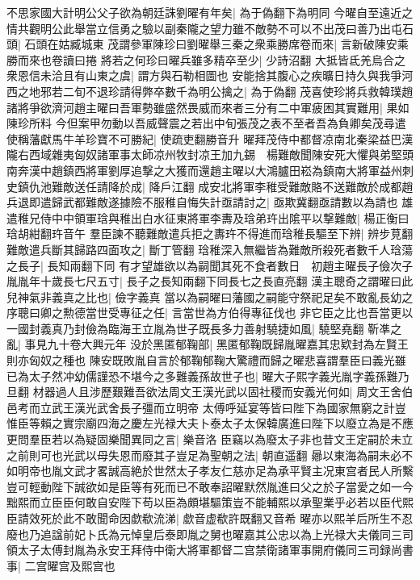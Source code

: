 不思家國大計明公父子欲為朝廷誅劉曜有年矣|{
	為于偽翻下為明同}
今曜自至遠近之情共觀明公此舉當立信勇之驗以副秦隴之望力雖不敵勢不可以不出茂曰善乃出屯石頭|{
	石頭在姑臧城東}
茂謂參軍陳珍曰劉曜舉三秦之衆乘勝席卷而來|{
	言新破陳安乘勝而來也卷讀曰捲}
將若之何珍曰曜兵雖多精卒至少|{
	少詩沼翻}
大抵皆氐羌烏合之衆恩信未洽且有山東之虞|{
	謂方與石勒相圖也}
安能捨其腹心之疾曠日持久與我爭河西之地邪若二旬不退珍請得弊卒數千為明公擒之|{
	為于偽翻}
茂喜使珍將兵救韓璞趙諸將爭欲濟河趙主曜曰吾軍勢雖盛然畏威而來者三分有二中軍疲困其實難用|{
	果如陳珍所料}
今但案甲勿動以吾威聲震之若出中旬張茂之表不至者吾為負卿矣茂尋遣使稱藩獻馬牛羊珍寶不可勝紀|{
	使疏吏翻勝音升}
曜拜茂侍中都督凉南北秦梁益巴漢隴右西域雜夷匈奴諸軍事太師凉州牧封凉王加九錫　楊難敵聞陳安死大懼與弟堅頭南奔漢中趙鎮西將軍劉厚追撃之大獲而還趙主曜以大鴻臚田崧為鎮南大將軍益州刺史鎮仇池難敵送任請降於成|{
	降戶江翻}
成安北將軍李稚受難敵賂不送難敵於成都趙兵退即遣歸武都難敵遂據險不服稚自悔失計亟請討之|{
	亟欺冀翻亟請數以為請也}
雄遣稚兄侍中中領軍琀與稚出白水征東將軍李夀及琀弟玝出隂平以撃難敵|{
	楊正衡曰琀胡紺翻玝音午}
羣臣諫不聽難敵遣兵拒之夀玝不得進而琀稚長驅至下辨|{
	辨步莧翻}
難敵遣兵斷其歸路四面攻之|{
	斷丁管翻}
琀稚深入無繼皆為難敵所殺死者數千人琀蕩之長子|{
	長知兩翻下同}
有才望雄欲以為嗣聞其死不食者數日　初趙主曜長子儉次子胤胤年十歲長七尺五寸|{
	長子之長知兩翻下同長七之長直亮翻}
漢主聰奇之謂曜曰此兒神氣非義真之比也|{
	儉字義真}
當以為嗣曜曰藩國之嗣能守祭祀足矣不敢亂長幼之序聰曰卿之勲德當世受專征之任|{
	言當世為方伯得專征伐也}
非它臣之比也吾當更以一國封義真乃封儉為臨海王立胤為世子既長多力善射驍捷如風|{
	驍堅堯翻}
靳凖之亂|{
	事見九十卷大興元年}
没於黑匿郁鞠部|{
	黑匿郁鞠既歸胤曜嘉其忠欵封為左賢王則亦匈奴之種也}
陳安既敗胤自言於郁鞠郁鞠大驚禮而歸之曜悲喜謂羣臣曰義光雖已為太子然冲幼儒謹恐不堪今之多難義孫故世子也|{
	曜大子熙字義光胤字義孫難乃旦翻}
材器過人且涉歷艱難吾欲法周文王漢光武以固社稷而安義光何如|{
	周文王舍伯邑考而立武王漢光武舍長子彊而立明帝}
太傅呼延宴等皆曰陛下為國家無窮之計豈惟臣等賴之實宗廟四海之慶左光禄大夫卜泰太子太保韓廣進曰陛下以廢立為是不應更問羣臣若以為疑固樂聞異同之言|{
	樂音洛}
臣竊以為廢太子非也昔文王定嗣於未立之前則可也光武以母失恩而廢其子豈足為聖朝之法|{
	朝直遥翻}
曏以東海為嗣未必不如明帝也胤文武才畧誠高絶於世然太子孝友仁慈亦足為承平賢主况東宫者民人所繫豈可輕動陛下誠欲如是臣等有死而已不敢奉詔曜默然胤進曰父之於子當愛之如一今黜熙而立臣臣何敢自安陛下苟以臣為頗堪驅策豈不能輔熙以承聖業乎必若以臣代熙臣請效死於此不敢聞命因歔欷流涕|{
	歔音虚欷許既翻又音希}
曜亦以熙羊后所生不忍廢也乃追諡前妃卜氏為元悼皇后泰即胤之舅也曜嘉其公忠以為上光禄大夫儀同三司領太子太傅封胤為永安王拜侍中衛大將軍都督二宫禁衛諸軍事開府儀同三司録尚書事|{
	二宫曜宫及熙宫也}
